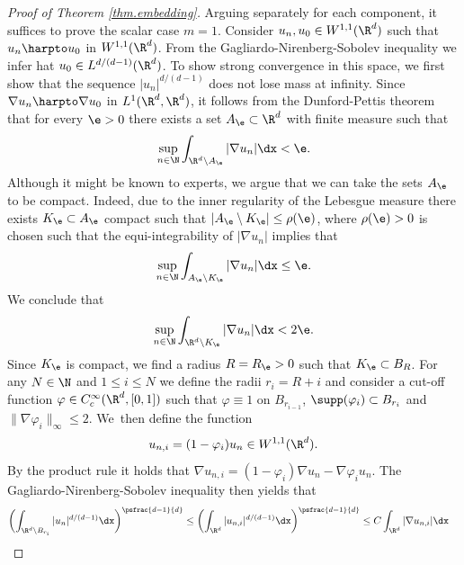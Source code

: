 \begin{proof}[Proof of Theorem \ref{thm.embedding}]
Arguing separately for each component, it suffices to prove the scalar case $m=1$. Consider $u_n,u_0\in W^{1,1}(\R^d)$ such that $ u_n\harpto u_0$ in $W^{1,1}(\R^d)$. From the Gagliardo-Nirenberg-Sobolev inequality we infer hat $u_0\in L^{d/(d-1)}(\R^d)$. To show strong convergence in this space, we first show that the sequence $|u_n|^{d/(d-1)}$ does not lose mass at infinity. Since $\nabla u_{n}\harpto \nabla u_0$ in $L^1(\R^d,\R^d)$, it follows from the Dunford-Pettis theorem that for every $\e>0$ there exists a set $A_{\e}\subset\R^d$ with finite measure such that\vspace*{-3pt}
\begin{equation*}
\sup_{n\in\N}\int_{\R^d\setminus A_{\e}}|\nabla u_{n}|\dx<\e.
\end{equation*}
Although it might be known to experts, we argue that we can take the sets $A_{\e}$ to be compact. Indeed, due to the inner regularity of the Lebesgue measure there exists $K_{\e}\subset A_{\e}$ compact such that $|A_{\e}\setminus K_{\e}|\leq\rho(\e)$, where $\rho(\e)>0$ is chosen such that the equi-integrability of $|\nabla u_n|$ implies that\vspace*{-3pt}
\begin{equation*}
\sup_{n\in\N}\int_{A_{\e}\setminus K_{\e}}|\nabla u_n|\dx\leq\e.
\end{equation*}
We conclude that\vspace*{-3pt}
\begin{equation*}
\sup_{n\in\N}\int_{\R^d\setminus K_{\e}}|\nabla u_{n}|\dx<2\e.
\end{equation*}
Since $K_{\e}$ is compact, we find a radius $R=R_{\e}>0$ such that $K_{\e}\subset B_R$. For any $N\in\N$ and $1\leq i\leq N$ we define the radii $r_i=R+i$ and consider a cut-off function $\varphi\in C_c^{\infty}(\R^d,[0,1])$ such that $\varphi\equiv 1$ on $B_{r_{i-1}}$, $\supp (\varphi_i)\subset B_{r_{i}}$ and $\|\nabla\varphi_i\|_{\infty}\leq 2$. We~then define the function\vspace*{-3pt}
\begin{equation*}
u_{n,i}=(1-\varphi_i)u_n\in W^{1,1}(\R^d).
\end{equation*}
By the product rule it holds that $\nabla u_{n,i}=(1-\varphi_i)\nabla u_n-\nabla \varphi_iu_n$. The Gagliardo-Nirenberg-Sobolev inequality then yields that\vspace*{-3pt}
\begin{align*}
\biggl(\int_{\R^d\setminus B_{r_i}}|u_{n}|^{d/(d-1)}\dx\biggr)^{\psfrac{d-1}{d}}&\leq \biggl(\int_{\R^d}|u_{n,i}|^{d/(d-1)}\dx\biggr)^{\psfrac{d-1}{d}}\leq C\int_{\R^d}|\nabla u_{n,i}|\dx

\end{align*}
\end{proof}
